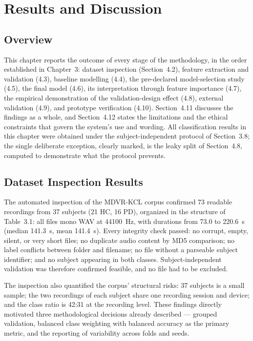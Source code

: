 \chapter{Results and Discussion}

\section{Overview}

This chapter reports the outcome of every stage of the methodology, in
the order established in Chapter~3: dataset inspection (Section~4.2),
feature extraction and validation (4.3), baseline modelling (4.4), the
pre-declared model-selection study (4.5), the final model (4.6), its
interpretation through feature importance (4.7), the empirical
demonstration of the validation-design effect (4.8), external
validation (4.9), and prototype verification (4.10). Section~4.11
discusses the findings as a whole, and Section~4.12 states the
limitations and the ethical constraints that govern the system's use
and wording. All classification results in this chapter were obtained
under the subject-independent protocol of Section~3.8; the single
deliberate exception, clearly marked, is the leaky split of
Section~4.8, computed to demonstrate what the protocol prevents.

\section{Dataset Inspection Results}

The automated inspection of the MDVR-KCL corpus confirmed 73 readable
recordings from 37 subjects (21 HC, 16 PD), organized in the structure
of Table~3.1: all files mono WAV at 44100~Hz, with durations from
73.0 to 220.6~s (median 141.3~s, mean 141.4~s). Every integrity check
passed: no corrupt, empty, silent, or very short files; no duplicate
audio content by MD5 comparison; no label conflicts between folder and
filename; no file without a parseable subject identifier; and no
subject appearing in both classes. Subject-independent validation was
therefore confirmed feasible, and no file had to be excluded.

The inspection also quantified the corpus' structural risks: 37
subjects is a small sample; the two recordings of each subject share
one recording session and device; and the class ratio is 42:31 at the
recording level. These findings directly motivated three methodological
decisions already described --- grouped validation, balanced class
weighting with balanced accuracy as the primary metric, and the
reporting of variability across folds and seeds.

